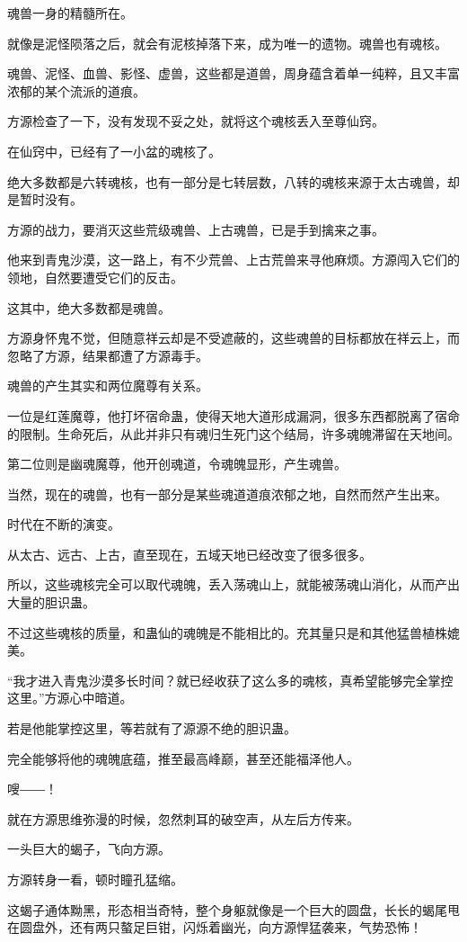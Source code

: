 \begin{this_body}
魂兽一身的精髓所在。

就像是泥怪陨落之后，就会有泥核掉落下来，成为唯一的遗物。魂兽也有魂核。

魂兽、泥怪、血兽、影怪、虚兽，这些都是道兽，周身蕴含着单一纯粹，且又丰富浓郁的某个流派的道痕。

方源检查了一下，没有发现不妥之处，就将这个魂核丢入至尊仙窍。

在仙窍中，已经有了一小盆的魂核了。

绝大多数都是六转魂核，也有一部分是七转层数，八转的魂核来源于太古魂兽，却是暂时没有。

方源的战力，要消灭这些荒级魂兽、上古魂兽，已是手到擒来之事。

他来到青鬼沙漠，这一路上，有不少荒兽、上古荒兽来寻他麻烦。方源闯入它们的领地，自然要遭受它们的反击。

这其中，绝大多数都是魂兽。

方源身怀鬼不觉，但随意祥云却是不受遮蔽的，这些魂兽的目标都放在祥云上，而忽略了方源，结果都遭了方源毒手。

魂兽的产生其实和两位魔尊有关系。

一位是红莲魔尊，他打坏宿命蛊，使得天地大道形成漏洞，很多东西都脱离了宿命的限制。生命死后，从此并非只有魂归生死门这个结局，许多魂魄滞留在天地间。

第二位则是幽魂魔尊，他开创魂道，令魂魄显形，产生魂兽。

当然，现在的魂兽，也有一部分是某些魂道道痕浓郁之地，自然而然产生出来。

时代在不断的演变。

从太古、远古、上古，直至现在，五域天地已经改变了很多很多。

所以，这些魂核完全可以取代魂魄，丢入荡魂山上，就能被荡魂山消化，从而产出大量的胆识蛊。

不过这些魂核的质量，和蛊仙的魂魄是不能相比的。充其量只是和其他猛兽植株媲美。

“我才进入青鬼沙漠多长时间？就已经收获了这么多的魂核，真希望能够完全掌控这里。”方源心中暗道。

若是他能掌控这里，等若就有了源源不绝的胆识蛊。

完全能够将他的魂魄底蕴，推至最高峰巅，甚至还能福泽他人。

嗖――！

就在方源思维弥漫的时候，忽然刺耳的破空声，从左后方传来。

一头巨大的蝎子，飞向方源。

方源转身一看，顿时瞳孔猛缩。

这蝎子通体黝黑，形态相当奇特，整个身躯就像是一个巨大的圆盘，长长的蝎尾甩在圆盘外，还有两只螯足巨钳，闪烁着幽光，向方源悍猛袭来，气势恐怖！


\end{this_body}

